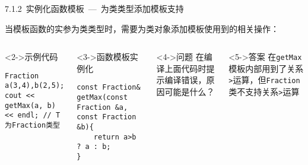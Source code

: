 \begin{frame}[fragile]{7.1.2~实例化函数模板\normalsize{~---~为类类型添加模板支持}}

当模板函数的实参为\alert{类类型}时，需要为类对象添加模板使用到的相关操作：

\vspace{-4mm}

\begin{columns}[t]
\begin{blueblock}<2->{示例代码}
\begin{lstlisting}[moreemph={Fraction}]
Fraction a(3,4),b(2,5);
cout << getMax(a, b) << endl; // T为Fraction类型
\end{lstlisting}
\end{blueblock}

\begin{blueblock}<3->{函数模板实例化}
\begin{lstlisting}
const Fraction& getMax(const Fraction &a, const Fraction &b){
    return a>b ? a : b;
}
\end{lstlisting}
\end{blueblock}

\begin{greenblock}<4->{问题}
在编译上面代码时提示编译错误，原因可能是什么？
\end{greenblock}
\begin{greenblock}<5->{答案}
在\texttt{getMax}模板内部用到了关系\texttt{>}运算，但\texttt{Fraction}类不支持关系\texttt{>}运算
\end{greenblock}
\end{columns}

\end{frame}


